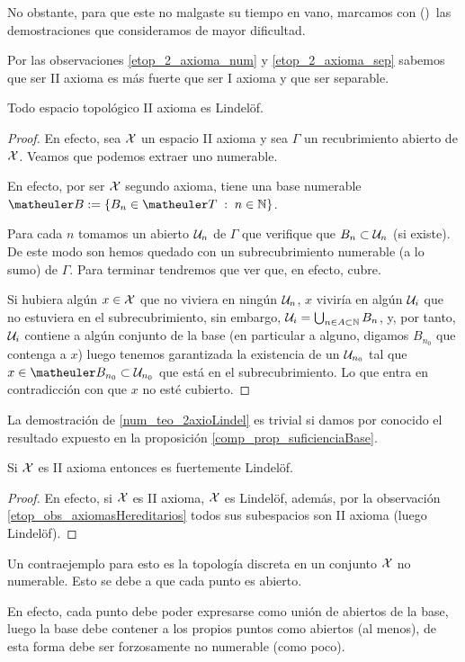 No obstante, para que este no malgaste su tiempo en vano, marcamos con (\Lightning)\ las demostraciones que consideramos de mayor dificultad.
\begin{obs}
	Por las observaciones \ref{etop_2_axioma_num} y \ref{etop_2_axioma_sep} sabemos que ser II axioma es más fuerte que ser I axioma y que ser separable. 
\end{obs}
\begin{theo}
	\label{num_teo_2axioLindel}
	Todo espacio topológico II axioma es Lindelöf.
\end{theo}
\begin{proof}
	En efecto, sea $\mathcal{X}$ un espacio II axioma y sea $\Gamma$ un recubrimiento abierto de $\mathcal{X}$. Veamos que podemos extraer uno numerable.
	
	En efecto, por ser $\mathcal{X}$ segundo axioma, tiene una base numerable $\B:=\{B_n\in\T\midc n\in\N\}$.
	
	Para cada $n$ tomamos un abierto $\mathcal{U}_n$ de $\Gamma$ que verifique que $B_n\subset \mathcal{U}_n$ (si existe). De este modo son hemos quedado con un subrecubrimiento numerable (a lo sumo) de $\Gamma$. Para terminar tendremos que ver que, en efecto, cubre.
	
	Si hubiera algún $x\in\mathcal{X}$ que no viviera en ningún $\mathcal{U}_n$, $x$ viviría en algún $\mathcal{U}_i$ que no estuviera en el subrecubrimiento, sin embargo, $\mathcal{U}_i=\bigcup_{n\in A\subset\mathbb{N}} B_n$, y, por tanto, $\mathcal{U}_i$ contiene a algún conjunto de la base (en particular a alguno, digamos $B_{n_0}$ que contenga a $x$) luego tenemos garantizada la existencia de un $\mathcal{U}_{n_0}$ tal que  $x\in\B_{n_0}\subset\U_{n_0}$ que está en el subrecubrimiento. Lo que entra en contradicción con que $x$ no esté cubierto.
\end{proof}
\begin{obs}
	La demostración de \ref{num_teo_2axioLindel} es trivial si damos por conocido el resultado expuesto en la proposición \ref{comp_prop_suficienciaBase}.
\end{obs}
\begin{lem}
	Si $\mathcal{X}$ es II axioma entonces es fuertemente Lindelöf.
\end{lem}
\begin{proof}
	En efecto, si $\mathcal{X}$ es II axioma, $\mathcal{X}$ es Lindelöf, además, por la observación \ref{etop_obs_axiomasHereditarios} todos sus subespacios son II axioma (luego Lindelöf).
\end{proof}
\begin{obs}
	Un contraejemplo para esto es la topología discreta en un conjunto $\mathcal{X}$ no numerable. Esto se debe a que cada punto es abierto.
	
	En efecto, cada punto debe poder expresarse como unión de abiertos de la base, luego la base debe contener a los propios puntos como abiertos (al menos), de esta forma debe ser forzosamente no numerable (como poco).
\end{obs}
